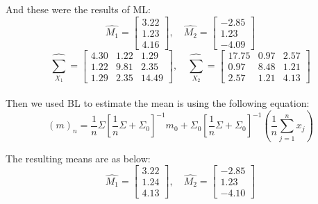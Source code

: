\documentclass[11pt, oneside]{article}   	%
\begin{document}
And these were the results of ML:$$\hat{M_1} = \begin{bmatrix}
3.22 \\ 1.23 \\ 4.16 
\end{bmatrix},\quad \hat{M_2} = \begin{bmatrix}
-2.85 \\ 1.23 \\ -4.09 
\end{bmatrix}$$
$$\hat{\sum_{X_1}} = \begin{bmatrix}
4.30 & 1.22 & 1.29 \\
1.22 & 9.81 & 2.35 \\
1.29 & 2.35 & 14.49 
\end{bmatrix}, \quad \hat{\sum_{X_2}} = \begin{bmatrix}
17.75 & 0.97 & 2.57 \\
0.97 & 8.48 & 1.21 \\
2.57 & 1.21 & 4.13 
\end{bmatrix}$$\\


Then we used BL to estimate the mean is using the following equation:
$$\left(m\right)_n=\frac{1}{n}\Sigma\left[\frac{1}{n}\Sigma+\Sigma_0\right]^{-1}m_0+\Sigma_0\left[\frac{1}{n}\Sigma+\Sigma_0\right]^{-1}\left(\frac{1}{n}\sum_{j=1}^{n}x_j\right)$$

The resulting means are as below:
$$\hat{M_1} = \begin{bmatrix}
3.22 \\ 1.24 \\ 4.13 
\end{bmatrix},\quad \hat{M_2} = \begin{bmatrix}
-2.85 \\ 1.23 \\ -4.10 
\end{bmatrix}$$
\end{document}
